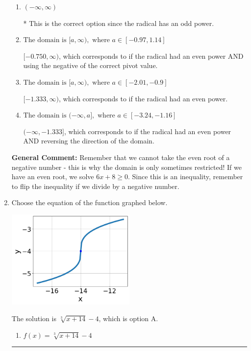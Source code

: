 \documentclass{extbook}[14pt]
\newcommand{\litem}[1]{\item #1

\rule{\textwidth}{0.4pt}}
\begin{document}
\begin{enumerate}
{\begin{enumerate}[label=\Alph*.]
$(-\infty, -0.750]$, which corresponds to if the radical had an even power AND reversing the direction of the domain AND using the negative of the correct pivot value.
\item \( (-\infty, \infty) \)

* This is the correct option since the radical has an odd power.
\item \( \text{The domain is } [a, \infty), \text{   where } a \in [-0.97, 1.14] \)

$[-0.750, \infty)$, which corresponds to if the radical had an even power AND using the negative of the correct pivot value.
\item \( \text{The domain is } [a, \infty), \text{   where } a \in [-2.01, -0.9] \)

$[-1.333, \infty)$, which corresponds to if the radical had an even power.
\item \( \text{The domain is } (-\infty, a], \text{   where } a \in [-3.24, -1.16] \)

$(-\infty, -1.333]$, which corresponds to if the radical had an even power AND reversing the direction of the domain.
\end{enumerate}

\textbf{General Comment:} Remember that we cannot take the even root of a negative number - this is why the domain is only sometimes restricted! If we have an even root, we solve $6 x + 8 \geq 0$. Since this is an inequality, remember to flip the inequality if we divide by a negative number.
}
\litem{
Choose the equation of the function graphed below.

\begin{center}
    \includegraphics[width=0.5\textwidth]{../Figures/radicalGraphToEquationCopyA.png}
\end{center}




The solution is \( \sqrt[3]{x + 14} - 4 \), which is option A.\begin{enumerate}[label=\Alph*.]
\item \( f(x) = \sqrt[3]{x + 14} - 4 \)


\end{enumerate}}
\end{enumerate}
\end{document}
